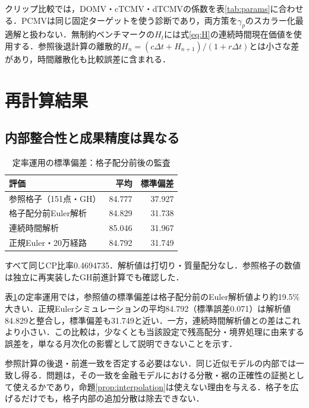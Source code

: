 \documentclass[10pt,a4paper]{article}
\numberwithin{equation}{section}
\numberwithin{table}{section}
\numberwithin{figure}{section}
\theoremstyle{plain}
\theoremstyle{definition}
\begin{document}
クリップ比較では，DOMV・cTCMV・dTCMVの係数を表\ref{tab:params}に合わせる．PCMVは同じ固定ターゲットを使う診断であり，両方策を$\gamma_p$のスカラー化最適解と扱わない．無制約ベンチマークの$H_t$には式\eqref{eq:H}の連続時間現在価値を使用する．参照後退計算の離散的$H_n=(c\Delta t+H_{n+1})/(1+r\Delta t)$とは小さな差があり，時間離散化も比較誤差に含まれる．

\section{再計算結果}
\label{sec:results}
\subsection{内部整合性と成果精度は異なる}
\begin{table}[htbp]\centering\small
\caption{定率運用の標準偏差：格子配分前後の監査}\label{tab:cp-audit}
\begin{tabular}{lrr}
\toprule
評価 & 平均 & 標準偏差 \\ \midrule
参照格子（151点・GH） & 84.777 & 37.927 \\
格子配分前Euler解析 & 84.829 & 31.738 \\
連続時間解析 & 85.046 & 31.967 \\
正規Euler・20万経路 & 84.792 & 31.749 \\
\bottomrule\end{tabular}
\par\vspace{3pt}\begin{minipage}{0.97\textwidth}\footnotesize すべて同じCP比率0.4694735．解析値は打切り・質量配分なし．参照格子の数値は独立に再実装したGH前進計算でも確認した．\end{minipage}
\end{table}
表\ref{tab:cp-audit}の定率運用では，参照値の標準偏差は格子配分前のEuler解析値より約19.5\%大きい．正規Eulerシミュレーションの平均84.792（標準誤差0.071）は解析値84.829と整合し，標準偏差も31.749と近い．一方，連続時間解析値との差はこれより小さい．この比較は，少なくとも当該設定で残高配分・境界処理に由来する誤差を，単なる月次化の影響として説明できないことを示す．

参照計算の後退・前進一致を否定する必要はない．同じ近似モデルの内部では一致し得る．問題は，その一致を金融モデルにおける分散・裾の正確性の証拠として使えるかであり，命題\ref{prop:interpolation}は使えない理由を与える．格子を広げるだけでも，格子内部の追加分散は除去できない．
\end{document}
